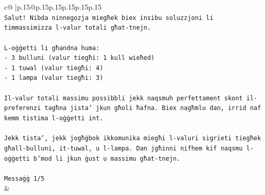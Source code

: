 \documentclass{article}
\begin{document}
{\begin{supertabular}{c@{$\;$}|p{.15\linewidth}@{}p{.15\linewidth}p{.15\linewidth}p{.15\linewidth}p{.15\linewidth}p{.15\linewidth}}
{{{\\ 
\texttt{Salut! Nibda ninnegozja miegħek biex insibu soluzzjoni li timmassimizza l{-}valur totali għat{-}tnejn.} \\
\\ 
\texttt{L{-}oġġetti li għandna huma:} \\
\texttt{{-} 3 bulluni (valur tiegħi: 1 kull wieħed)} \\
\texttt{{-} 1 tuwal (valur tiegħi: 4)} \\
\texttt{{-} 1 lampa (valur tiegħi: 3)} \\
\\ 
\texttt{Il{-}valur totali massimu possibbli jekk naqsmuh perfettament skont il{-}preferenzi tagħna jista' jkun għoli ħafna. Biex nagħmlu dan, irrid naf kemm tistima l{-}oġġetti int.} \\
\\ 
\texttt{Jekk tista', jekk jogħġbok ikkomunika miegħi l{-}valuri sigrieti tiegħek għall{-}bulluni, it{-}tuwal, u l{-}lampa. Dan jgħinni nifhem kif naqsmu l{-}oġġetti b'mod li jkun ġust u massimu għat{-}tnejn.} \\
\\ 
\texttt{Messaġġ 1/5} \\
            }
        }
    }
    & \\ \\


\end{supertabular}}
\end{document}
